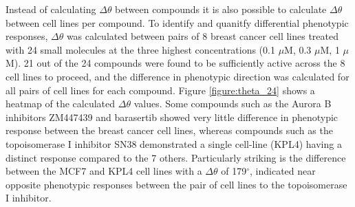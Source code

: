 \documentclass[a4paper,11pt,twoside,openright]{scrbook}
\begin{document}
Instead of calculating $\Delta\theta$ between compounds it is also possible to calculate $\Delta\theta$ between cell lines per compound.
To identify and quanitfy differential phenotypic responses, $\Delta\theta$ was calculated between pairs of 8 breast cancer cell lines treated with 24 small molecules at the three highest concentrations (0.1 $\mu$M, 0.3 $\mu$M, 1 $\mu$M).
21 out of the 24 compounds were found to be sufficiently active across the 8 cell lines to proceed, and the difference in phenotypic direction was calculated for all pairs of cell lines for each compound.
Figure \ref{figure:theta_24} shows a heatmap of the calculated $\Delta\theta$ values.
Some compounds such as the Aurora B inhibitors ZM447439 and barasertib showed very little difference in phenotypic response between the breast cancer cell lines, whereas compounds such as the topoisomerase I inhibitor SN38 demonstrated a single cell-line (KPL4) having a distinct response compared to the 7 others.
Particularly striking is the difference between the MCF7 and KPL4 cell lines with a $\Delta\theta$ of 179$^\circ$, indicated near opposite phenotypic responses between the pair of cell lines to the topoisomerase I inhibitor.
\end{document}
